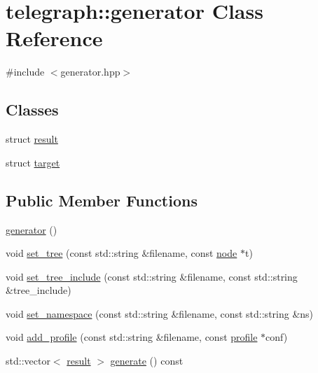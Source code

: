 \hypertarget{classtelegraph_1_1generator}{}\section{telegraph\+:\+:generator Class Reference}
\label{classtelegraph_1_1generator}


{\ttfamily \#include $<$generator.\+hpp$>$}

\subsection*{Classes}
\begin{DoxyCompactItemize}
\item 
struct \hyperlink{structtelegraph_1_1generator_1_1result}{result}
\item 
struct \hyperlink{structtelegraph_1_1generator_1_1target}{target}
\end{DoxyCompactItemize}
\subsection*{Public Member Functions}
\begin{DoxyCompactItemize}
\item 
\hyperlink{classtelegraph_1_1generator_add831bd47c4792a2b4a2726fc13bada4}{generator} ()
\item 
void \hyperlink{classtelegraph_1_1generator_ab9540639f075db70b2763fbe7c462a94}{set\+\_\+tree} (const std\+::string \&filename, const \hyperlink{classtelegraph_1_1node}{node} $\ast$t)
\item 
void \hyperlink{classtelegraph_1_1generator_ac2e6da6fff01552c4084d27310dba3da}{set\+\_\+tree\+\_\+include} (const std\+::string \&filename, const std\+::string \&tree\+\_\+include)
\item 
void \hyperlink{classtelegraph_1_1generator_a51756531241b5bc309736fc9fc5eba39}{set\+\_\+namespace} (const std\+::string \&filename, const std\+::string \&ns)
\item 
void \hyperlink{classtelegraph_1_1generator_a7cb9bbac059ab2fca31937d2982506a8}{add\+\_\+profile} (const std\+::string \&filename, const \hyperlink{classtelegraph_1_1profile}{profile} $\ast$conf)
\item 
std\+::vector$<$ \hyperlink{structtelegraph_1_1generator_1_1result}{result} $>$ \hyperlink{classtelegraph_1_1generator_a5964a5dba70c651c616e9d5fbbcf6ca2}{generate} () const
\end{DoxyCompactItemize}


